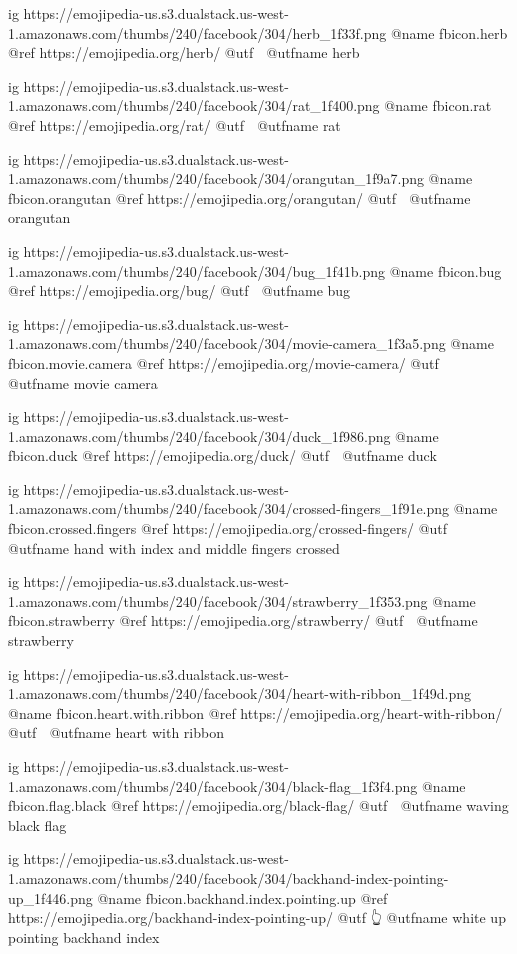   ig https://emojipedia-us.s3.dualstack.us-west-1.amazonaws.com/thumbs/240/facebook/304/herb_1f33f.png
  @name fbicon.herb
  @ref https://emojipedia.org/herb/
  @utf 🌿
  @utfname herb

  ig https://emojipedia-us.s3.dualstack.us-west-1.amazonaws.com/thumbs/240/facebook/304/rat_1f400.png
  @name fbicon.rat
  @ref https://emojipedia.org/rat/
  @utf 🐀
  @utfname rat

  ig https://emojipedia-us.s3.dualstack.us-west-1.amazonaws.com/thumbs/240/facebook/304/orangutan_1f9a7.png
  @name fbicon.orangutan
  @ref https://emojipedia.org/orangutan/
  @utf 🦧
  @utfname orangutan

  ig https://emojipedia-us.s3.dualstack.us-west-1.amazonaws.com/thumbs/240/facebook/304/bug_1f41b.png
  @name fbicon.bug
  @ref https://emojipedia.org/bug/
  @utf 🐛
  @utfname bug

  ig https://emojipedia-us.s3.dualstack.us-west-1.amazonaws.com/thumbs/240/facebook/304/movie-camera_1f3a5.png
  @name fbicon.movie.camera
  @ref https://emojipedia.org/movie-camera/
  @utf 🎥
  @utfname movie camera

  ig https://emojipedia-us.s3.dualstack.us-west-1.amazonaws.com/thumbs/240/facebook/304/duck_1f986.png
  @name fbicon.duck
  @ref https://emojipedia.org/duck/
  @utf 🦆
  @utfname duck

  ig https://emojipedia-us.s3.dualstack.us-west-1.amazonaws.com/thumbs/240/facebook/304/crossed-fingers_1f91e.png
  @name fbicon.crossed.fingers
  @ref https://emojipedia.org/crossed-fingers/
  @utf 🤞
  @utfname hand with index and middle fingers crossed

  ig https://emojipedia-us.s3.dualstack.us-west-1.amazonaws.com/thumbs/240/facebook/304/strawberry_1f353.png
  @name fbicon.strawberry
  @ref https://emojipedia.org/strawberry/
  @utf 🍓
  @utfname strawberry

  ig https://emojipedia-us.s3.dualstack.us-west-1.amazonaws.com/thumbs/240/facebook/304/heart-with-ribbon_1f49d.png
  @name fbicon.heart.with.ribbon
  @ref https://emojipedia.org/heart-with-ribbon/
  @utf 💝
  @utfname heart with ribbon

  ig https://emojipedia-us.s3.dualstack.us-west-1.amazonaws.com/thumbs/240/facebook/304/black-flag_1f3f4.png
  @name fbicon.flag.black
  @ref https://emojipedia.org/black-flag/
  @utf 🏴
  @utfname waving black flag

  ig https://emojipedia-us.s3.dualstack.us-west-1.amazonaws.com/thumbs/240/facebook/304/backhand-index-pointing-up_1f446.png
  @name fbicon.backhand.index.pointing.up
  @ref https://emojipedia.org/backhand-index-pointing-up/
  @utf 👆
  @utfname white up pointing backhand index


